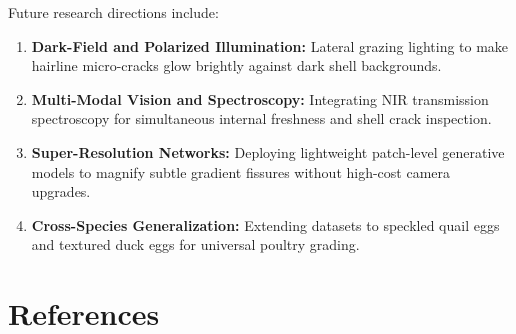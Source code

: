 \documentclass[12pt,a4paper]{report}
\begin{document}
Future research directions include:
\begin{enumerate}[label=\arabic*.]
    \item \textbf{Dark-Field and Polarized Illumination:} Lateral grazing lighting to make hairline micro-cracks glow brightly against dark shell backgrounds.
    \item \textbf{Multi-Modal Vision and Spectroscopy:} Integrating NIR transmission spectroscopy for simultaneous internal freshness and shell crack inspection.
    \item \textbf{Super-Resolution Networks:} Deploying lightweight patch-level generative models to magnify subtle gradient fissures without high-cost camera upgrades.
    \item \textbf{Cross-Species Generalization:} Extending datasets to speckled quail eggs and textured duck eggs for universal poultry grading.
\end{enumerate}


\chapter*{References}
\end{document}
